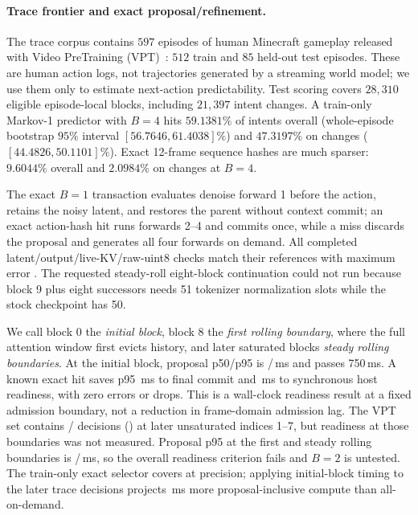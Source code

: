 \documentclass[11pt]{article}
\begin{document}
\paragraph{Trace frontier and exact proposal/refinement.}
The trace corpus contains $597$ episodes of human Minecraft gameplay released with Video PreTraining (VPT)~\cite{vpt}: $512$ train and $85$ held-out test episodes. These are human action logs, not trajectories generated by a streaming world model; we use them only to estimate next-action predictability. Test scoring covers $28{,}310$ eligible episode-local blocks, including $21{,}397$ intent changes. A train-only Markov-1 predictor with $B=4$ hits $59.1381\%$ of intents overall (whole-episode bootstrap $95\%$ interval $[56.7646,61.4038]\%$) and $47.3197\%$ on changes ($[44.4826,50.1101]\%$). Exact 12-frame sequence hashes are much sparser: $9.6044\%$ overall and $2.0984\%$ on changes at $B=4$.

The exact $B=1$ transaction evaluates denoise forward 1 before the action, retains the noisy latent, and restores the parent without context commit; an exact action-hash hit runs forwards 2--4 and commits once, while a miss discards the proposal and generates all four forwards on demand. All \ProposalCheckpointCount{} completed latent/output/live-KV/raw-uint8 checks match their references with maximum error \ProposalMaxError{}. The requested steady-roll eight-block continuation could not run because block 9 plus eight successors needs 51 tokenizer normalization slots while the stock checkpoint has 50.

We call block 0 the \emph{initial block}, block 8 the \emph{first rolling boundary}, where the full attention window first evicts history, and later saturated blocks \emph{steady rolling boundaries}. At the initial block, proposal p50/p95 is \PreRollProposalMedianMs{}/\PreRollProposalTailMs{}\,ms and passes 750\,ms. A known exact hit saves p95 \PreRollCommitSaveTailMs{}\,ms to final commit and \PreRollHostSaveTailMs{}\,ms to synchronous host readiness, with zero errors or drops. This is a wall-clock readiness result at a fixed admission boundary, not a reduction in frame-domain admission lag. The VPT set contains \PreRollEligibleDecisions{}/\VPTEligibleBlocks{} decisions (\PreRollEligibleFraction{}) at later unsaturated indices 1--7, but readiness at those boundaries was not measured. Proposal p95 at the first and steady rolling boundaries is \FirstRollProposalTailMs{}/\SteadyRollProposalTailMs{}\,ms, so the overall readiness criterion fails and $B=2$ is untested. The train-only exact selector covers \ExactConfidenceCoverage{} at \ExactConfidencePrecision{} precision; applying initial-block timing to the later trace decisions projects \ExactConfidenceWorkDeltaMs{}\,ms more proposal-inclusive compute than all-on-demand.
\end{document}
